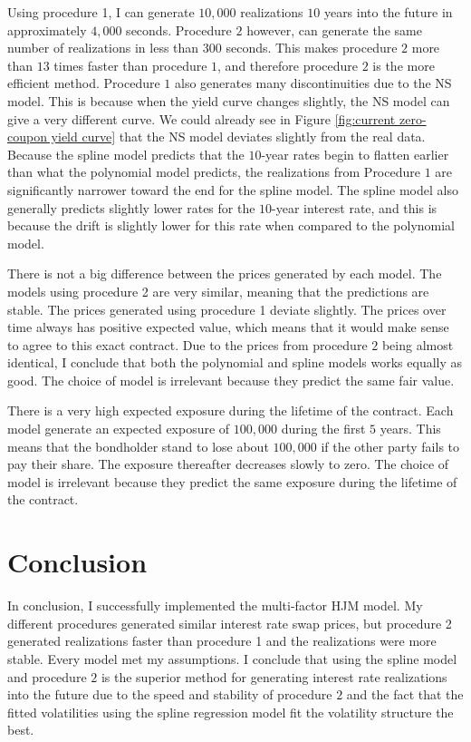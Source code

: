 Using procedure 1, I can generate $10,000$ realizations $10$ years into the future in approximately $4,000$ seconds. Procedure $2$ however, can generate the same number of realizations in less than $300$ seconds. This makes procedure $2$ more than $13$ times faster than procedure $1$, and therefore procedure $2$ is the more efficient method. Procedure $1$ \newpage \noindent also generates many discontinuities due to the NS model. This is because when the yield curve changes slightly, the NS model can give a very different curve. We could already see in Figure \ref{fig:current zero-coupon yield curve} that the NS model deviates slightly from the real data. Because the spline model predicts that the $10$-year rates begin to flatten earlier than what the polynomial model predicts, the realizations from Procedure $1$ are significantly narrower toward the end for the spline model. The spline model also generally predicts slightly lower rates for the $10$-year interest rate, and this is because the drift is slightly lower for this rate when compared to the polynomial model.

There is not a big difference between the prices generated by each model. The models using procedure 2 are very similar, meaning that the predictions are stable. The prices generated using procedure 1 deviate slightly. The prices over time always has positive expected value, which means that it would make sense to agree to this exact contract. Due to the prices from procedure $2$ being almost identical, I conclude that both the polynomial and spline models works equally as good. The choice of model is irrelevant because they predict the same fair value.

There is a very high expected exposure during the lifetime of the contract. Each model generate an expected exposure of $100,000$ during the first $5$ years. This means that the bondholder stand to lose about $100,000$ if the other party fails to pay their share. The exposure thereafter decreases slowly to zero. The choice of model is irrelevant because they predict the same exposure during the lifetime of the contract.



\section{Conclusion}

\noindent In conclusion, I successfully implemented the multi-factor HJM model. My different procedures generated similar interest rate swap prices, but procedure 2 generated realizations faster than procedure 1 and the realizations were more stable. Every model met my assumptions. I conclude that using the spline model and procedure $2$ is the superior method for generating interest rate realizations into the future due to the speed and stability of procedure $2$ and the fact that the fitted volatilities using the spline regression model fit the volatility structure the best.

